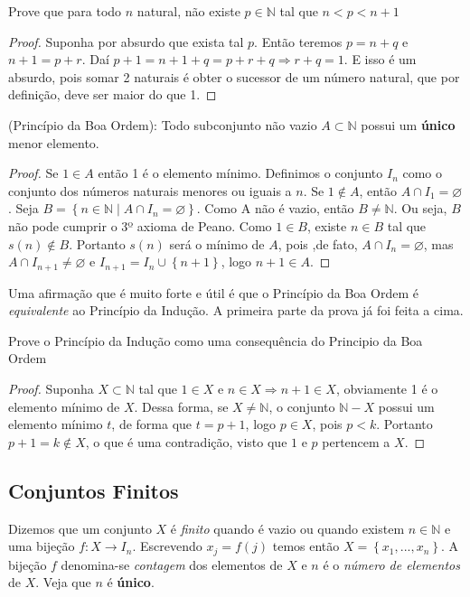 \begin{prob}
Prove que para todo $n$ natural, não existe $p \in \mathbb{N}$ tal que $n < p < n+1$
\end{prob}
\begin{proof}
Suponha por absurdo que exista tal $p$. Então teremos $p=n+q$ e $n+1=p+r$. Daí $p+1=n+1+q=p+r+q\Rightarrow r+q=1$. E isso é um absurdo, pois somar 2 naturais é obter o sucessor de um número natural, que por definição, deve ser maior do que 1.
\end{proof}

\begin{theorem}
(Princípio da Boa Ordem): Todo subconjunto não vazio $A\subset \mathbb{N}$ possui um \textbf{único} menor elemento.
\end{theorem}

\begin{proof}
Se $1 \in A$ então 1 é o elemento mínimo. Definimos o conjunto $I_{n}$ como o conjunto dos números naturais menores ou iguais a $n$. Se $1\notin A$, então $A\cap I_{1}=\varnothing$. Seja $B=\left \{ n \in \mathbb{N} \mid A\cap I_{n}=\varnothing \right \}.$ Como A
não é vazio, então $B \neq \mathbb{N}$. Ou seja, $B$ não pode cumprir o 3º axioma de Peano. Como $1 \in B$, existe $n \in B$ tal que $s(n) \notin B$. Portanto $s(n)$ será o mínimo de $A$, pois ,de fato, $A\cap I_{n}=\varnothing$, mas $A\cap I_{n+1} \neq \varnothing $ e $ I_{n+1}= I_{n}\cup \left \{ n+1 \right \}$, logo $n+1 \in A$.
\end{proof}
Uma afirmação que é muito forte e útil é que o Princípio da Boa Ordem é \textit{equivalente} ao Princípio da Indução. A primeira parte da prova já foi feita a cima.

\begin{prob}
Prove o Princípio da Indução como uma consequência do Principio da Boa Ordem 
\end{prob}

\begin{proof}
Suponha $X \subset \mathbb{N}$ tal que $1 \in X$ e $n \in X\Rightarrow n+1 \in X$, obviamente 1 é o elemento mínimo de $X$. Dessa forma, se $X \neq \mathbb{N}$, o conjunto $\mathbb{N}-X$ possui um elemento mínimo $t$, de forma que $t=p+1$, logo $p \in X$, pois $p<k$. Portanto $p+1=k\notin X$, o que é uma contradição, visto que $1$ e $p$ pertencem a $X$. 
\end{proof}


\subsection{Conjuntos Finitos}
Dizemos que um conjunto $X$ é \textit{finito} quando é vazio ou quando existem $n \in \mathbb{N}$ e uma bijeção $f:X\rightarrow I_{n}$. Escrevendo $x_{j}=f(j)$ temos então $X=\left \{ x_{1},...,x_{n} \right \}$. A bijeção $f$ denomina-se \textit{contagem} dos elementos de $X$ e $n$ é o \textit{número de elementos} de $X$. Veja que $n$ é \textbf{único}.

